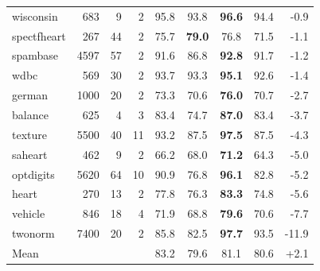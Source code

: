 \begin{table}[t]
\begin{tabular}{@{}lrrrccccr@{}}
wisconsin & 683 & 9 & 2 & 95.8 & 93.8 & \textbf{96.6} & 94.4 & -0.9\\
spectfheart & 267 & 44 & 2 & 75.7 & \textbf{79.0} & 76.8 & 71.5 & -1.1\\
spambase & 4597 & 57 & 2 & 91.6 & 86.8 & \textbf{92.8} & 91.7 & -1.2\\
wdbc & 569 & 30 & 2 & 93.7 & 93.3 & \textbf{95.1} & 92.6 & -1.4\\
german & 1000 & 20 & 2 & 73.3 & 70.6 & \textbf{76.0} & 70.7 & -2.7\\
balance & 625 & 4 & 3 & 83.4 & 74.7 & \textbf{87.0} & 83.4 & -3.7\\
texture & 5500 & 40 & 11 & 93.2 & 87.5 & \textbf{97.5} & 87.5 & -4.3\\
saheart & 462 & 9 & 2 & 66.2 & 68.0 & \textbf{71.2} & 64.3 & -5.0\\
optdigits & 5620 & 64 & 10 & 90.9 & 76.8 & \textbf{96.1} & 82.8 & -5.2\\
heart & 270 & 13 & 2 & 77.8 & 76.3 & \textbf{83.3} & 74.8 & -5.6\\
vehicle & 846 & 18 & 4 & 71.9 & 68.8 & \textbf{79.6} & 70.6 & -7.7\\
twonorm & 7400 & 20 & 2 & 85.8 & 82.5 & \textbf{97.7} & 93.5 & -11.9\\
\midrule
Mean & & & & 83.2 & 79.6 & 81.1 & 80.6 & +2.1\\
\bottomrule
\end{tabular}
\end{table}

